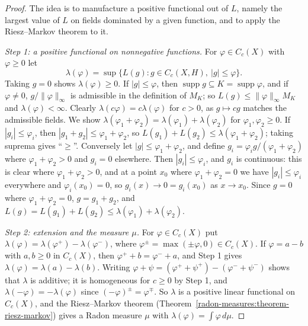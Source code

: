 \begin{proof}
The idea is to manufacture a positive functional out of $L$, namely the largest value of $L$ on fields dominated by a given function, and to apply the Riesz--Markov theorem to it.

\emph{Step 1: a positive functional on nonnegative functions.} For $\varphi \in C_c(X)$ with $\varphi \geq 0$ let
\[
\lambda(\varphi) = \sup\bigl\{L(g) : g \in C_c(X, H),\ |g| \leq \varphi\bigr\}.
\]
Taking $g = 0$ shows $\lambda(\varphi) \geq 0$. If $|g| \leq \varphi$, then $\operatorname{supp}g \subseteq K = \operatorname{supp}\varphi$, and if $\varphi \neq 0$, $g/\|\varphi\|_\infty$ is admissible in the
definition of $M_K$; so $L(g) \leq \|\varphi\|_\infty M_K$ and $\lambda(\varphi) < \infty$. Clearly $\lambda(c\varphi) = c\lambda(\varphi)$ for $c > 0$, as $g \mapsto cg$ matches the admissible fields. We
show $\lambda(\varphi_1 + \varphi_2) = \lambda(\varphi_1) + \lambda(\varphi_2)$ for $\varphi_1, \varphi_2 \geq 0$. If $|g_i| \leq \varphi_i$, then $|g_1 + g_2| \leq \varphi_1 + \varphi_2$, so
$L(g_1) + L(g_2) \leq \lambda(\varphi_1 + \varphi_2)$; taking suprema gives ``$\geq$''. Conversely let $|g| \leq \varphi_1 + \varphi_2$, and define $g_i = \varphi_ig/(\varphi_1 + \varphi_2)$ where
$\varphi_1 + \varphi_2 > 0$ and $g_i = 0$ elsewhere. Then $|g_i| \leq \varphi_i$, and $g_i$ is continuous: this is clear where $\varphi_1 + \varphi_2 > 0$, and at a point $x_0$ where
$\varphi_1 + \varphi_2 = 0$ we have $|g_i| \leq \varphi_i$ everywhere and $\varphi_i(x_0) = 0$, so $g_i(x) \to 0 = g_i(x_0)$ as $x \to x_0$. Since $g = 0$ where $\varphi_1 + \varphi_2 = 0$, $g = g_1 + g_2$, and
$L(g) = L(g_1) + L(g_2) \leq \lambda(\varphi_1) + \lambda(\varphi_2)$.

\emph{Step 2: extension and the measure $\mu$.} For $\varphi \in C_c(X)$ put $\lambda(\varphi) = \lambda(\varphi^+) - \lambda(\varphi^-)$, where $\varphi^\pm = \max(\pm\varphi, 0) \in C_c(X)$. If
$\varphi = a - b$ with $a, b \geq 0$ in $C_c(X)$, then $\varphi^+ + b = \varphi^- + a$, and Step 1 gives $\lambda(\varphi) = \lambda(a) - \lambda(b)$. Writing
$\varphi + \psi = (\varphi^+ + \psi^+) - (\varphi^- + \psi^-)$ shows that $\lambda$ is additive; it is homogeneous for $c \geq 0$ by Step 1, and $\lambda(-\varphi) = -\lambda(\varphi)$ since
$(-\varphi)^\pm = \varphi^\mp$. So $\lambda$ is a positive linear functional on $C_c(X)$, and the Riesz--Markov theorem (Theorem~\ref{radon-measures:theorem-riesz-markov}) gives a Radon measure $\mu$ with
$\lambda(\varphi) = \int\varphi\,d\mu$.


\end{proof}
